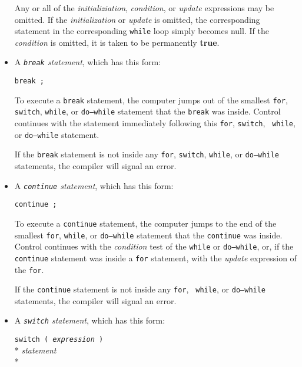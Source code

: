 \begin{itemize}
Any or all of the {\em initializiation}\/, {\em condition}\/, or {\em
update} expressions may be omitted.  If the {\em initialization}\/ or
{\em update} is omitted, the corresponding statement in the
corresponding {\tt while} loop simply becomes null.  If the {\em
condition} is omitted, it is taken to be permanently {\bf true}.

\item A {\em {\tt break} statement}\/, which has this form:

\begin{flushleft}
{\tt break ;}
\end{flushleft}

To execute a {\tt break} statement, the computer jumps out of the
smallest {\tt for}, {\tt switch}, {\tt while}, or {\tt do{\rm--}while}
statement that the {\tt break} was inside.  Control continues with the
statement immediately following this {\tt for}, {\tt switch}, {\tt
while}, or {\tt do{\rm--}while} statement.

If the {\tt break} statement is not inside any {\tt for}, {\tt switch},
{\tt while}, or {\tt do{\rm--}while} statements, the compiler will
signal an error.

\item A {\em {\tt continue} statement}\/, which has this form:

\begin{flushleft}
{\tt continue ;}
\end{flushleft}

To execute a {\tt continue} statement, the computer jumps to the end of
the smallest {\tt for}, {\tt while}, or {\tt do{\rm--}while} statement
that the {\tt continue} was inside.  Control continues with the {\em
condition}\/ test of the {\tt while} or {\tt do{\rm--}while}, or, if the
{\tt continue} statement was inside a {\tt for} statement, with the {\em
update} expression of the {\tt for}.

If the {\tt continue} statement is not inside any {\tt for}, {\tt
while}, or {\tt do{\rm--}while} statements, the compiler will signal an
error.

\item A {\em {\tt switch} statement}\/, which has this form:

\begin{flushleft}
{\tt switch ( {\em expression} )  } \\*
{\hspace{8pt}\em statement} \\*
\end{flushleft}


\end{itemize}
